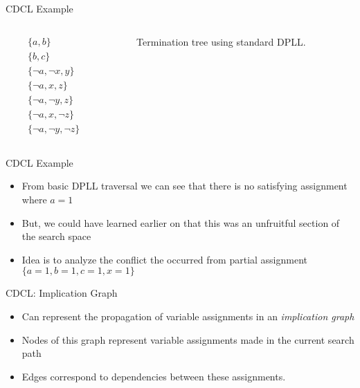 \documentclass{beamer}
\begin{document}
\begin{frame}{CDCL Example}

    \begin{columns}
        \begin{column}{0.25\textwidth}
            \begin{align*}
                &\{a,b\}\\
                &\{b,c\}\\
                &\{\neg a, \neg x, y\} \\
                &\{\neg a, x, z\} \\
                &\{ \neg a, \neg y, z\} \\
                &\{ \neg a, x, \neg z\} \\
                &\{ \neg a, \neg y, \neg z\}
            \end{align*}
        \end{column}

        \begin{column}{0.65\textwidth}
            \begin{figure}
                
                \caption{Termination tree using standard DPLL.}
            \end{figure}
        \end{column}
    \end{columns}
\end{frame}

\begin{frame}{CDCL Example}
\begin{itemize}
    \item From basic DPLL traversal we can see that there is no satisfying assignment where $a=1$
    \item But, we could have learned earlier on that this was an unfruitful section of the search space
    \item Idea is to analyze the conflict the occurred from partial assignment $\{a=1,b=1,c=1,x=1\}$
\end{itemize}
\end{frame}

\begin{frame}{CDCL: Implication Graph}
    \begin{itemize}
        \item Can represent the propagation of variable assignments in an \textit{implication graph}
        \item Nodes of this graph represent variable assignments made in the current search path
        \item Edges correspond to dependencies between these assignments.
\end{itemize}
\end{frame}
\end{document}
